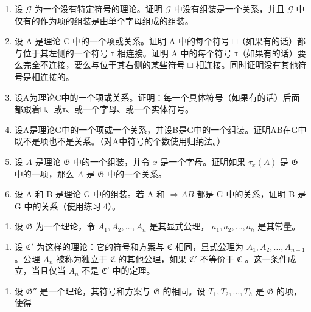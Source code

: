 \startexercises

\exercisegroup

\begin{enumerate}
\def\labelenumi{\arabic{enumi}.}
\item
  设 \(\mathcal{G}\) 为一个没有特定符号的理论。证明 \(\mathcal{G}\) 中没有组装是一个关系，并且 \(\mathcal{G}\) 中仅有的作为项的组装是由单个字母组成的组装。
\item
  设 A 是理论 C 中的一个项或关系。证明 A 中的每个符号 □（如果有的话）都与位于其左侧的一个符号 τ 相连接。证明 A 中的每个符号 τ（如果有的话）要么完全不连接，要么与位于其右侧的某些符号 □ 相连接。同时证明没有其他符号是相连接的。
\item
  设A为理论C中的一个项或关系。证明：每一个具体符号（如果有的话）后面都跟着□、或τ、或一个字母、或一个实体符号。
\item
  设A是理论G中的一个项或一个关系，并设B是G中的一个组装。证明AB在G中既不是项也不是关系。（对A中符号的个数使用归纳法。）
\item
  设 \(A\) 是理论 \(\mathfrak{G}\) 中的一个组装，并令 \(x\) 是一个字母。证明如果 \(\tau_{x}(A)\) 是 \(\mathfrak{G}\) 中的一项，那么 \(A\) 是 \(\mathfrak{G}\) 中的一个关系。
\item
  设 A 和 B 是理论 G 中的组装。若 A 和 \(\Longrightarrow AB\) 都是 G 中的关系，证明 B 是 G 中的关系（使用练习 4）。
\end{enumerate}

\exercisegroup

\begin{enumerate}
\def\labelenumi{\arabic{enumi}.}
\tightlist
\item
  设 \(\mathfrak{G}\) 为一个理论，令 \(A_{1}, A_{2}, \ldots, A_{n}\) 是其显式公理， \(a_{1}, a_{2}, \ldots, a_{h}\) 是其常量。
\end{enumerate}

\begin{enumerate}
\def\labelenumi{(\alph{enumi})}
\tightlist
\item
  设 \(\mathfrak{C}'\) 为这样的理论：它的符号和方案与 \(\mathfrak{C}\) 相同，显式公理为 \(A_1, A_2, \ldots, A_{n-1}\) 。公理 \(A_n\) 被称为独立于 \(\mathfrak{C}\) 的其他公理，如果 \(\mathfrak{C}'\) 不等价于 \(\mathfrak{C}\) 。这一条件成立，当且仅当 \(A_n\) 不是 \(\mathfrak{C}'\) 中的定理。
\end{enumerate}

\begin{enumerate}
\def\labelenumi{(\alph{enumi})}
\setcounter{enumi}{1}
\tightlist
\item
  设 \(\mathfrak{G}''\) 是一个理论，其符号和方案与 \(\mathfrak{G}\) 的相同。设 \(T_1, T_2, \ldots, T_h\) 是 \(\mathfrak{G}\) 的项，使得
\end{enumerate}

